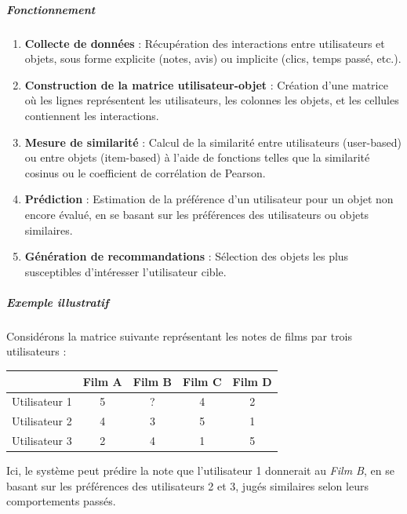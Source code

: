 \documentclass{article}
\begin{document}
    \subparagraph{Fonctionnement}
    \begin{enumerate}
        \item \textbf{Collecte de données} : Récupération des interactions entre utilisateurs et objets, sous forme explicite (notes, avis) ou implicite (clics, temps passé, etc.).

        \item \textbf{Construction de la matrice utilisateur-objet} : Création d’une matrice où les lignes représentent les utilisateurs, les colonnes les objets, et les cellules contiennent les interactions.

        \item \textbf{Mesure de similarité} : Calcul de la similarité entre utilisateurs (user-based) ou entre objets (item-based) à l’aide de fonctions telles que la similarité cosinus ou le coefficient de corrélation de Pearson.

        \item \textbf{Prédiction} : Estimation de la préférence d’un utilisateur pour un objet non encore évalué, en se basant sur les préférences des utilisateurs ou objets similaires.

        \item \textbf{Génération de recommandations} : Sélection des objets les plus susceptibles d’intéresser l’utilisateur cible.
    \end{enumerate}

    \subparagraph{Exemple illustratif}
    Considérons la matrice suivante représentant les notes de films par trois utilisateurs :

    \begin{center}
        \begin{tabular}{|c|c|c|c|c|}
            \hline
            & Film A & Film B & Film C & Film D \\
            \hline
            Utilisateur 1 & 5 & ? & 4 & 2 \\
            \hline
            Utilisateur 2 & 4 & 3 & 5 & 1 \\
            \hline
            Utilisateur 3 & 2 & 4 & 1 & 5 \\
            \hline
        \end{tabular}
    \end{center}

    Ici, le système peut prédire la note que l'utilisateur 1 donnerait au \textit{Film B}, en se basant sur les préférences des utilisateurs 2 et 3, jugés similaires selon leurs comportements passés.
\end{document}
